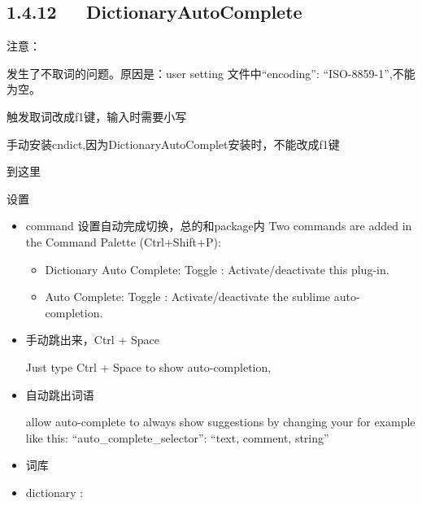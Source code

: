 \documentclass[letterpaper,12pt,english]{sphinxmanual}
\begin{document}
\subsection{1.4.12   Dictionary​Auto​Complete}
\label{\detokenize{001software/001install/sublime:dictionaryautocomplete}}

注意：

发生了不取词的问题。原因是：user setting 文件中“encoding”:
“ISO-8859-1”,不能为空。

触发取词改成f1键，输入时需要小写

手动安装cndict,因为Dictionary​Auto​Complet安装时，不能改成f1键

到这里

设置
\begin{itemize}
\item {} 
command 设置自动完成切换，总的和package内 Two commands are added in
the Command Palette (Ctrl+Shift+P):
\begin{itemize}
\item {} 
Dictionary Auto Complete: Toggle : Activate/deactivate this
plug-in.

\item {} 
Auto Complete: Toggle : Activate/deactivate the sublime
auto-completion.

\end{itemize}

\item {} 
手动跳出来，Ctrl + Space

Just type Ctrl + Space to show auto-completion,

\item {} 
自动跳出词语

allow auto-complete to always show suggestions by changing your
 for example like this:
“auto\_complete\_selector”: “text, comment, string”

\item {} 
词库

\end{itemize}

\begin{itemize}
\item {} 
dictionary :

\end{itemize}
\end{document}
